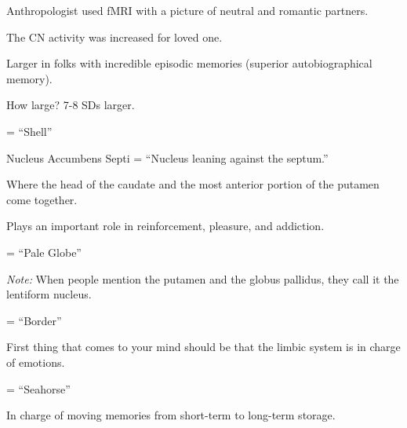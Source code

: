 \begin{coloredlist}
\begin{coloredlist}
\begin{coloredlist}
\begin{coloredlist}
\begin{coloredlist}
\begin{coloredlist}
                    \item Anthropologist used fMRI with a picture of neutral and romantic partners.
                    \item The CN activity was increased for loved one.
                \end{coloredlist}
            \end{coloredlist}
            \item Larger in folks with incredible episodic memories (superior autobiographical memory).
            \begin{coloredlist}
                \item How large? 7-8 SDs larger.
            \end{coloredlist}
        \end{coloredlist}
        \item {} = ``Shell''
        \item {}
        \begin{coloredlist}
            \item Nucleus Accumbens Septi = ``Nucleus leaning against the septum.''
            \begin{coloredlist}
                \item Where the head of the caudate and the most anterior portion of the putamen come together.
                \item Plays an important role in reinforcement, pleasure, and addiction.
            \end{coloredlist}
        \end{coloredlist}
    \end{coloredlist}
    \item {} = ``Pale Globe''
    \item \textit{Note:} When people mention the putamen and the globus pallidus, they call it the lentiform nucleus.
    \begin{coloredlist}
        \item {} = ``Border''
        \item First thing that comes to your mind should be that the limbic system is in charge of emotions.
        \begin{coloredlist}
            \item {} = ``Seahorse''
            \begin{coloredlist}
                \item In charge of moving memories from short-term to long-term storage.

\end{coloredlist}
\end{coloredlist}
\end{coloredlist}
\end{coloredlist}
\end{coloredlist}

